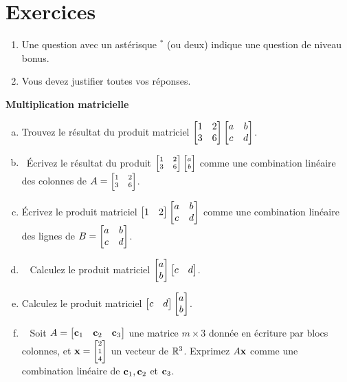 \section*{Exercices}

\begin{enumerate}
\item Une question avec un astérisque $ ^\ast$ (ou deux) indique une question de niveau bonus.
 \item Vous devez justifier toutes vos réponses.  
\end{enumerate}
\bigskip

\centerline{\bf  {Multiplication matricielle}} 
 \begin{prob} \label{prob14.1}
\begin{enumerate}[a)]
\item Trouvez le résultat du produit matriciel $\bmatrix 1&
2\\ 3&6\endbmatrix \bmatrix a&b\\ c&d\endbmatrix$.
\medskip
 
\item\sov~Écrivez le résultat du produit $\scriptsize\bmatrix 1&
2\\ 3&6\endbmatrix \bmatrix a\\ b\endbmatrix$ comme une combination lin\'eaire des colonnes de $A=\scriptsize\bmatrix 1&
2\\ 3&6\endbmatrix$.
\medskip
 
\item  \'Ecrivez le produit matriciel $\bmatrix 1&
2\endbmatrix \bmatrix a&b\\ c&d\endbmatrix$ comme une combination lin\'eaire des lignes de  $B=\bmatrix a&b\\ c&d\endbmatrix$.
\medskip
 
\item\sov~ Calculez le produit matriciel $\bmatrix a \\ b \endbmatrix \bmatrix c&d \endbmatrix$.
\medskip
 

\item Calculez le produit matriciel $\bmatrix c&d \endbmatrix \bmatrix a \\ b \endbmatrix $.
\medskip
 
\item\sov~ Soit $A=\bmatrix \cc_1&\cc_2 &\cc_3\endbmatrix$ une matrice $m\times 3$ donn\'ee en écriture par blocs colonnes, et $\xx=\scriptsize\bmatrix 2\\1\\ 4\endbmatrix$ un  vecteur de $\mathbb{R}^3$. Exprimez $A\mathbf{x}$ comme une combination lin\'eaire de $\mathbf{c}_1, \mathbf{c}_2$ et $\mathbf{c}_3$. 
\medskip
 

\end{enumerate}
\end{prob}
